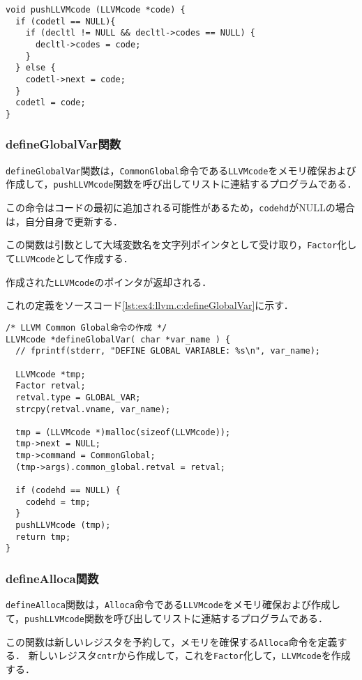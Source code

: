\documentclass[uplatex]{jsarticle}
\begin{document}
\begin{lstlisting}[caption=pushLLVMcode関数の定義,label=lst:ex4:llvm.c:pushLLVMcode]
void pushLLVMcode (LLVMcode *code) {
  if (codetl == NULL){
    if (decltl != NULL && decltl->codes == NULL) {
      decltl->codes = code;
    }
  } else {
    codetl->next = code;
  }
  codetl = code;
}

\end{lstlisting}

\subsubsection{defineGlobalVar関数}
\verb#defineGlobalVar#関数は，\verb#CommonGlobal#命令である\verb#LLVMcode#をメモリ確保および作成して，\verb#pushLLVMcode#関数を呼び出してリストに連結するプログラムである．

この命令はコードの最初に追加される可能性があるため，\verb#codehd#がNULLの場合は，自分自身で更新する．

この関数は引数として大域変数名を文字列ポインタとして受け取り，\verb#Factor#化して\verb#LLVMcode#として作成する．

作成された\verb#LLVMcode#のポインタが返却される．

これの定義をソースコード\ref{lst:ex4:llvm.c:defineGlobalVar}に示す．

\begin{lstlisting}[caption=defineGlobalVar関数の定義,label=lst:ex4:llvm.c:defineGlobalVar]
/* LLVM Common Global命令の作成 */
LLVMcode *defineGlobalVar( char *var_name ) {
  // fprintf(stderr, "DEFINE GLOBAL VARIABLE: %s\n", var_name);

  LLVMcode *tmp;
  Factor retval;
  retval.type = GLOBAL_VAR;
  strcpy(retval.vname, var_name);

  tmp = (LLVMcode *)malloc(sizeof(LLVMcode));
  tmp->next = NULL;
  tmp->command = CommonGlobal;
  (tmp->args).common_global.retval = retval;

  if (codehd == NULL) {
    codehd = tmp;
  }
  pushLLVMcode (tmp);
  return tmp;
}
\end{lstlisting}

\subsubsection{defineAlloca関数}
\verb#defineAlloca#関数は，\verb#Alloca#命令である\verb#LLVMcode#をメモリ確保および作成して，\verb#pushLLVMcode#関数を呼び出してリストに連結するプログラムである．

この関数は新しいレジスタを予約して，メモリを確保する\verb#Alloca#命令を定義する．
新しいレジスタ\verb#cntr#から作成して，これを\verb#Factor#化して，\verb#LLVMcode#を作成する．
\end{document}
